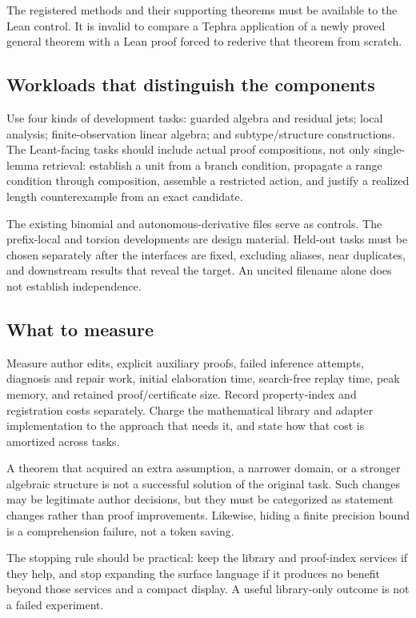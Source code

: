 \documentclass[11pt,a4paper]{article}
\theoremstyle{plain}
\theoremstyle{definition}
\begin{document}
The registered methods and their supporting theorems must be available to the Lean control. It is invalid to compare a Tephra application of a newly proved general theorem with a Lean proof forced to rederive that theorem from scratch.

\subsection{Workloads that distinguish the components}
Use four kinds of development tasks: guarded algebra and residual jets; local analysis; finite-observation linear algebra; and subtype/structure constructions. The Leant-facing tasks should include actual proof compositions, not only single-lemma retrieval: establish a unit from a branch condition, propagate a range condition through composition, assemble a restricted action, and justify a realized length counterexample from an exact candidate.

The existing binomial and autonomous-derivative files serve as controls. The prefix-local and torsion developments are design material. Held-out tasks must be chosen separately after the interfaces are fixed, excluding aliases, near duplicates, and downstream results that reveal the target. An uncited filename alone does not establish independence.

\subsection{What to measure}
Measure author edits, explicit auxiliary proofs, failed inference attempts, diagnosis and repair work, initial elaboration time, search-free replay time, peak memory, and retained proof/certificate size. Record property-index and registration costs separately. Charge the mathematical library and adapter implementation to the approach that needs it, and state how that cost is amortized across tasks.

A theorem that acquired an extra assumption, a narrower domain, or a stronger algebraic structure is not a successful solution of the original task. Such changes may be legitimate author decisions, but they must be categorized as statement changes rather than proof improvements. Likewise, hiding a finite precision bound is a comprehension failure, not a token saving.

The stopping rule should be practical: keep the library and proof-index services if they help, and stop expanding the surface language if it produces no benefit beyond those services and a compact display. A useful library-only outcome is not a failed experiment.
\end{document}
